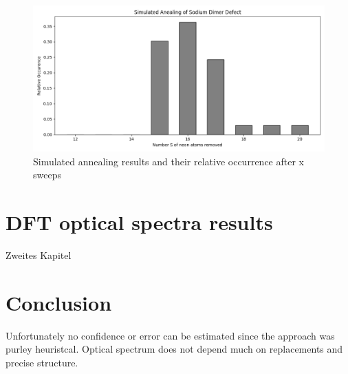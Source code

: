 \begin{figure}[h!]
	\centering
	\includegraphics[scale = 0.5]{Inhalt/Bilder/optimaldimer.png}
	\caption{Simulated annealing results and their relative occurrence after x sweeps}
	\label{fig:simulatedannealingsodiumdimer}
\end{figure}

\chapter{DFT optical spectra results}
\label{chap:Zweites Kapitel}
%
Zweites Kapitel
%
%
\chapter{Conclusion}
Unfortunately no confidence or error can be estimated since the approach was purley heuristcal. Optical spectrum does not depend much on replacements and precise structure.



